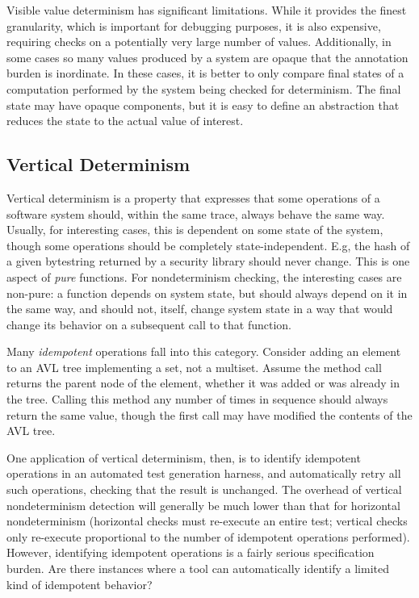 Visible value determinism has significant limitations.  While it
provides the finest granularity, which is
important for debugging purposes, it is also expensive, requiring
checks on a potentially very large number of
values.  Additionally, in some cases so many values produced by a
system are opaque that the annotation burden is inordinate.  In these
cases, it is better to only compare final states of a computation
performed by the system being checked for determinism.  The final
state may have opaque components, but it is easy to define an
abstraction that reduces the state to the actual value of interest.



\subsection{Vertical Determinism}

Vertical determinism is a property that expresses that some operations
of a software system should, within the same trace, always behave the
same way.  Usually, for interesting cases, this is dependent on some
state of the system, though some operations should be completely
state-independent.  E.g, the hash of a given bytestring returned by a
security library should never change.  This is one aspect of
\emph{pure} functions.  For nondeterminism checking, the interesting
cases are non-pure: a function depends on system state, but should
always depend on it in the same way, and should not, itself, change
system state in a way that would change its behavior on a subsequent
call to that function.

Many \emph{idempotent} operations fall into this category.
Consider adding an element to an AVL tree implementing a set, not a
multiset.  Assume the method call returns the parent node of the
element, whether it was added or was already in the tree.  Calling
this method any number of times in sequence should always return the
same value, though the first call may have modified the contents of
the AVL tree.

One application of vertical determinism, then, is to identify
idempotent operations in an automated test generation harness, and
automatically retry all such operations, checking that the
result is unchanged.  The overhead of vertical nondeterminism detection will
generally be much lower than that for horizontal nondeterminism
(horizontal checks must re-execute an entire test; vertical checks
only re-execute proportional to the number of idempotent operations
performed).  However, identifying idempotent operations is a
fairly serious specification burden.  Are there instances where a tool
can automatically identify a limited kind of idempotent behavior?

